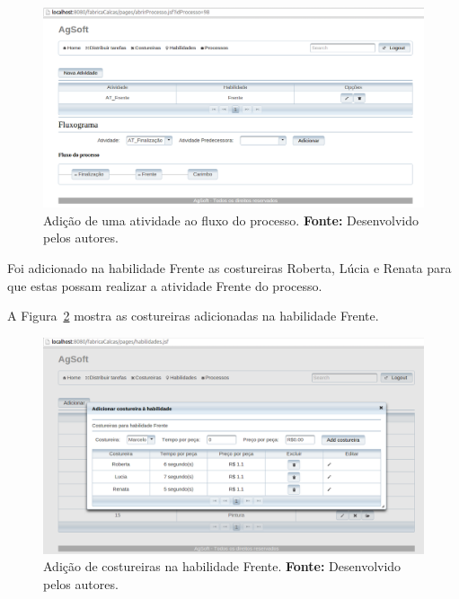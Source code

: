 \begin{figure}[h!]
	\centerline{\includegraphics[scale=0.3]{./imagens/adicionar_atividade_frente_teste4.png}}
	\caption[Adição de uma atividade ao fluxo do processo.]
	{Adição de uma atividade ao fluxo do processo. \textbf{Fonte:} Desenvolvido
	pelos autores.}
	\label{fig:add_frente_teste4}
\end{figure}


\par Foi adicionado na habilidade Frente as costureiras Roberta, Lúcia e Renata
para que estas possam realizar a atividade Frente do processo.
\par A Figura~\ref{fig:add_costureira_frente_teste4} mostra as costureiras
adicionadas na habilidade Frente.

\newpage

\begin{figure}[h!]
	\centerline{\includegraphics[scale=0.3]{./imagens/costureiras_at_frente_tete5.png}}
	\caption[Adição de costureiras na habilidade Frente.]
	{Adição de costureiras na habilidade Frente. \textbf{Fonte:} Desenvolvido pelos
	autores.}
	\label{fig:add_costureira_frente_teste4}
\end{figure}

